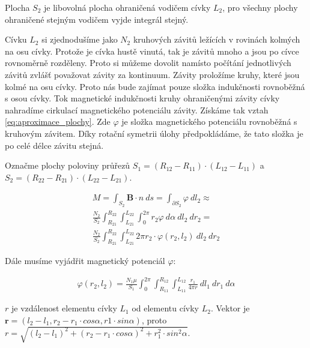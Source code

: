 \documentclass{book}
\newcommand{\vect}[1]{\boldsymbol{#1}}
\begin{document}
Plocha \(S_2\) je libovolná plocha ohraničená vodičem cívky \(L_2\), pro všechny plochy ohraničené stejným vodičem vyjde integrál stejný.

Cívku \(L_2\) si zjednodušíme jako \(N_2\) kruhových závitů ležících v rovinách kolmých na osu cívky. Protože je cívka hustě vinutá, tak je závitů mnoho a jsou po cívce rovnoměrně rozděleny. Proto si můžeme dovolit namísto počítání jednotlivých závitů zvlášť považovat závity za kontinuum. Závity proložíme kruhy, které jsou kolmé na osu cívky. Proto nás bude zajímat pouze složka indukčnosti rovnoběžná s osou cívky. Tok magnetické indukčnosti kruhy ohraničenými závity cívky nahradíme cirkulací magnetického potenciálu závity. Získáme tak vztah \eqref{eq:aproximace_plochy}. Zde \(\varphi\) je složka magnetického potenciálu rovnoběžná s kruhovým závitem. Díky rotační symetrii úlohy předpokládáme, že tato složka je po celé délce závitu stejná.

Označme plochy poloviny průřezů \(S_1 = (R_{12} - R_{11}) \cdot (L_{12} - L_{11})\) a \(S_2 = (R_{22} - R_{21}) \cdot (L_{22} - L_{21})\).

\begin{equation}
\label{eq:aproximace_plochy}
\begin{split}
M = \int_{S_2} \vect{B} \cdot {n} \ ds = \int_{\partial S_2} \varphi \ dl_2 \approx \\
\frac{N_2}{S_2} \int_{R_{21}}^{R_{22}} \int_{L_{21}}^{L_{22}} \int_{0}^{2 \pi} r_2 \varphi \ d\alpha \ dl_2 \ dr_2 = \\
\frac{N_2}{S_2} \int_{R_{21}}^{R_{22}} \int_{L_{21}}^{L_{22}} 2 \pi r_2 \cdot \varphi(r_2, l_2) \ dl_2 \ dr_2 
\end{split}
\end{equation}

Dále musíme vyjádřit magnetický potenciál \(\varphi\):

\begin{equation}
\label{eq:civky_potencial}
\begin{split}
\varphi(r_2, l_2) = \frac{N_1 \mu}{S_1} \int_{0}^{2 \pi} \int_{R_{11}}^{R_{12}} \int_{L_{11}}^{L_{12}} \frac{r_1}{4 \pi r}  \ dl_1 \ dr_1 \ d \alpha
\end{split}
\end{equation}

\(r\) je vzdálenost elementu cívky \(L_1\) od elementu cívky \(L_2\). Vektor je \(\vect{r} = (l_2 - l_1, r_2 - r_1 \cdot cos \alpha, r1 \cdot sin \alpha)\), proto \(r = \sqrt{(l_2 - l_1)^2 + (r_2 - r_1 \cdot cos \alpha)^2 + r_1^2 \cdot sin^2 \alpha}\).
\end{document}
